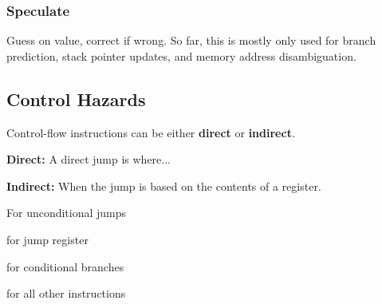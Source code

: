 \subsubsection{Speculate}
Guess on value, correct if wrong.
So far, this is mostly only used for branch prediction, stack pointer updates, and memory address disambiguation.


\subsection{Control Hazards}
Control-flow instructions can be either \textbf{direct} or \textbf{indirect}.

\textbf{Direct:} A direct jump is where...

\textbf{Indirect:} When the jump is based on the contents of a register.

For unconditional jumps

for jump register

for conditional branches

for all other instructions


